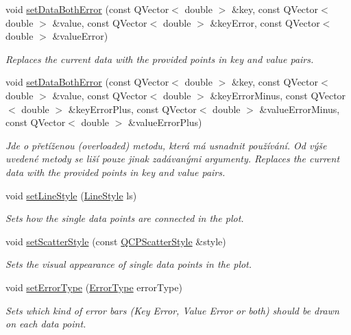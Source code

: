 \begin{DoxyCompactItemize}
void \hyperlink{classQCPGraph_a873fe46bdb20be5710428e474ade8908}{set\+Data\+Both\+Error} (const Q\+Vector$<$ double $>$ \&key, const Q\+Vector$<$ double $>$ \&value, const Q\+Vector$<$ double $>$ \&key\+Error, const Q\+Vector$<$ double $>$ \&value\+Error)
\begin{DoxyCompactList}\small\item\em Replaces the current data with the provided points in {\itshape key} and {\itshape value} pairs. \end{DoxyCompactList}\item 
void \hyperlink{classQCPGraph_abb75736ecdbf6e6a7501e1da64fb18cf}{set\+Data\+Both\+Error} (const Q\+Vector$<$ double $>$ \&key, const Q\+Vector$<$ double $>$ \&value, const Q\+Vector$<$ double $>$ \&key\+Error\+Minus, const Q\+Vector$<$ double $>$ \&key\+Error\+Plus, const Q\+Vector$<$ double $>$ \&value\+Error\+Minus, const Q\+Vector$<$ double $>$ \&value\+Error\+Plus)
\begin{DoxyCompactList}\small\item\em Jde o přetíženou (overloaded) metodu, která má usnadnit používání. Od výše uvedené metody se liší pouze jinak zadávanými argumenty. Replaces the current data with the provided points in {\itshape key} and {\itshape value} pairs. \end{DoxyCompactList}\item 
void \hyperlink{classQCPGraph_a513fecccff5b2a50ce53f665338c60ff}{set\+Line\+Style} (\hyperlink{classQCPGraph_ad60175cd9b5cac937c5ee685c32c0859}{Line\+Style} ls)
\begin{DoxyCompactList}\small\item\em Sets how the single data points are connected in the plot. \end{DoxyCompactList}\item 
void \hyperlink{classQCPGraph_a12bd17a8ba21983163ec5d8f42a9fea5}{set\+Scatter\+Style} (const \hyperlink{classQCPScatterStyle}{Q\+C\+P\+Scatter\+Style} \&style)
\begin{DoxyCompactList}\small\item\em Sets the visual appearance of single data points in the plot. \end{DoxyCompactList}\item 
void \hyperlink{classQCPGraph_ac3614d799c3894f2bc646e99c7f73d38}{set\+Error\+Type} (\hyperlink{classQCPGraph_ad23b514404bd2cb3216f57c90904d6af}{Error\+Type} error\+Type)
\begin{DoxyCompactList}\small\item\em Sets which kind of error bars (Key Error, Value Error or both) should be drawn on each data point. \end{DoxyCompactList}\item 

\end{DoxyCompactItemize}
